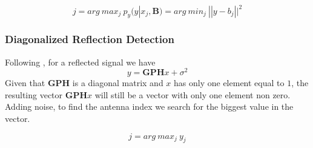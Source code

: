 \begin{equation}
  j = arg\ max_j\ p_y (y | x_j, \bm{B}) = arg\ min_j\ || y - b_j ||^2
  \label{eq:direct_detection}
\end{equation}

\subsubsection{Diagonalized Reflection Detection}
Following \cite{9328149}, for a reflected signal we have
\begin{equation}
  y = \bm{GPH}x + \sigma^2
\end{equation}
Given that $\bm{GPH}$ is a diagonal matrix and $x$ has only one element equal to $1$, the resulting vector $\bm{GPH}x$ will still be a vector with only one element non zero. Adding noise, to find the antenna index we search for the biggest value in the vector.

\begin{equation}
  j = arg\ max_j\ y_j
  \label{eq:reflection_detection}
\end{equation}